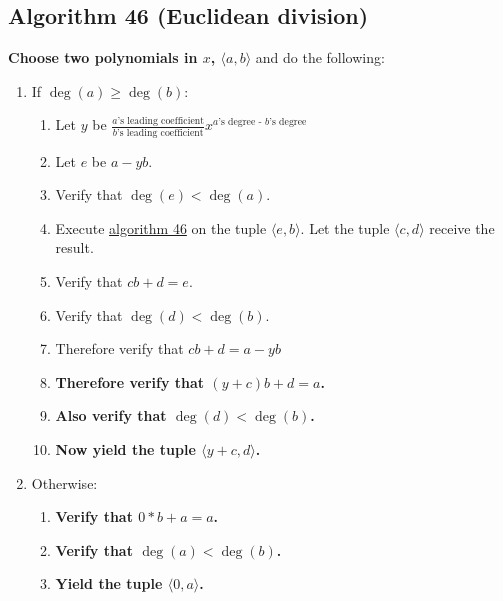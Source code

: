 \documentclass[twocolumn]{article}
\begin{document}
		\subsection{Algorithm 46 (Euclidean division)}\label{sec:algorithm 46}
			\textbf{Choose two polynomials in $x$, $\langle a,b\rangle$} and do the following:
			\begin{enumerate}
				\item If $\deg(a)\ge\deg(b)$:
				\begin{enumerate}
					\item Let $y$ be $\frac{\text{$a$'s leading coefficient}}{\text{$b$'s leading coefficient}}x^{\text{$a$'s degree - $b$'s degree}}$
					\item Let $e$ be $a-yb$.
					\item Verify that $\deg(e)<\deg(a)$.
					\item Execute \hyperref[sec:algorithm 46]{algorithm 46} on the tuple $\langle e,b\rangle$. Let the tuple $\langle c,d\rangle$ receive the result.
					\item Verify that $cb+d=e$.
					\item Verify that $\deg(d)<\deg(b)$.
					\item Therefore verify that $cb+d=a-yb$
					\item \textbf{Therefore verify that $(y+c)b+d=a$.}
					\item \textbf{Also verify that $\deg(d)<\deg(b)$.}
					\item \textbf{Now yield the tuple $\langle y+c, d\rangle$.}
				\end{enumerate}
				\item Otherwise:
				\begin{enumerate}
					\item \textbf{Verify that $0*b+a=a$.}
					\item \textbf{Verify that $\deg(a)<\deg(b)$.}
					\item \textbf{Yield the tuple $\langle 0,a\rangle$.}
				\end{enumerate}
			\end{enumerate}
\end{document}

